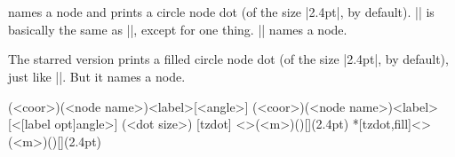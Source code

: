\begin{tzcode}{.3}
\end{tzcode}


\begin{tzcode}{.3}
\end{tzcode}


\begin{tzcode}{.3}
\end{tzcode}



\section{\protect\cmd{\tznodedot(*)}}
\label{s:tznodedot}

\icmd{\tznodedot} names a node and prints a circle node dot (of the size |2.4pt|, by default).
|\tznodedot| is basically the same as |\tzdot|, except for one thing.
|\tznodedot| names a node.

The starred version \icmd{\tznodedot*} prints a filled circle node dot (of the size |2.4pt|, by default), just like |\tzdot*|. But it  names a node.

\begin{tzdef}
\tznodedot(<coor>)(<node name>){<label>}[<angle>]
           (<coor>)(<node name>){<label>}[<[label opt]angle>] (<dot size>)
  [tzdot]     <>(<m>)(){}[](2.4pt)
 *[tzdot,fill]<>(<m>)(){}[](2.4pt)
\end{tzdef}

